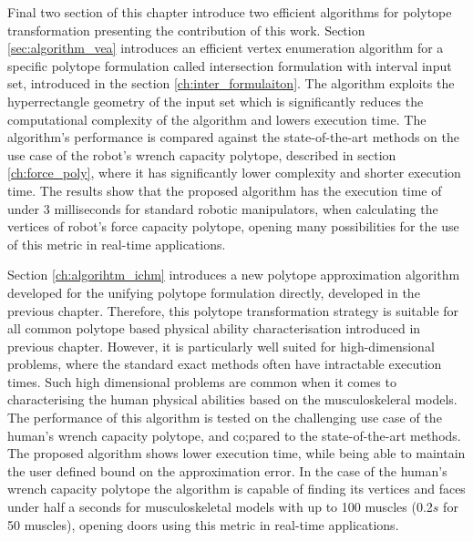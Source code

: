 Final two section of this chapter introduce two efficient algorithms for polytope transformation presenting the contribution of this work. Section \ref{sec:algorithm_vea} introduces an efficient vertex enumeration algorithm for a specific polytope formulation called intersection formulation with interval input set, introduced in the section \ref{ch:inter_formulaiton}. The algorithm exploits the hyperrectangle geometry of the input set which is significantly reduces the computational complexity of the algorithm and lowers execution time. The algorithm's performance is compared against the state-of-the-art methods on the use case of the robot's wrench capacity polytope, described in section \ref{ch:force_poly}, where it has significantly lower complexity and shorter execution time. The results show that the proposed algorithm has the execution time of under 3 milliseconds for standard robotic manipulators, when calculating the vertices of robot's force capacity polytope, opening many possibilities for the use of this metric in real-time applications. 

Section \ref{ch:algorihtm_ichm} introduces a new polytope approximation algorithm developed for the unifying polytope formulation directly, developed in the previous chapter. Therefore, this polytope transformation strategy is suitable for all common polytope based physical ability characterisation introduced in previous chapter. However, it is particularly well suited for high-dimensional problems, where the standard exact methods often have intractable execution times. Such high dimensional problems are common when it comes to characterising the human physical abilities based on the musculoskeleral models. The performance of this algorithm is tested on the challenging use case of the human's wrench capacity polytope, and co;pared to the state-of-the-art methods. The proposed algorithm shows lower execution time, while being able to maintain the user defined bound on the approximation error. In the case of the human's wrench capacity polytope the algorithm is capable of finding its vertices and faces under half a seconds for musculoskeletal models with up to 100 muscles (0.2$s$ for 50 muscles), opening doors using this metric in real-time applications.



